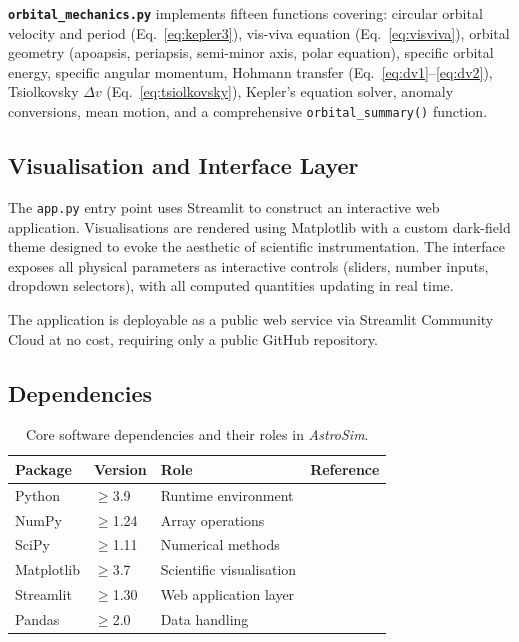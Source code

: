 \documentclass[10pt,a4paper]{article}
\begin{document}
\textbf{\texttt{orbital\_mechanics.py}} implements fifteen functions covering:
circular orbital velocity and period (Eq.~\ref{eq:kepler3}), vis-viva equation
(Eq.~\ref{eq:visviva}), orbital geometry (apoapsis, periapsis, semi-minor axis,
polar equation), specific orbital energy, specific angular momentum, Hohmann
transfer (Eq.~\ref{eq:dv1}--\ref{eq:dv2}), Tsiolkovsky $\Delta v$
(Eq.~\ref{eq:tsiolkovsky}), Kepler's equation solver, anomaly conversions, mean
motion, and a comprehensive \texttt{orbital\_summary()} function.

\subsection{Visualisation and Interface Layer}

The \texttt{app.py} entry point uses Streamlit \citep{streamlit2019} to
construct an interactive web application.
Visualisations are rendered using Matplotlib \citep{hunter2007} with a custom
dark-field theme designed to evoke the aesthetic of scientific instrumentation.
The interface exposes all physical parameters as interactive controls
(sliders, number inputs, dropdown selectors), with all computed quantities
updating in real time.

The application is deployable as a public web service via Streamlit Community
Cloud at no cost, requiring only a public GitHub repository.

\subsection{Dependencies}

\begin{table}[h!]
\centering
\caption{Core software dependencies and their roles in \textit{AstroSim}.}
\label{tab:deps}
\begin{tabular}{llll}
\toprule
Package & Version & Role & Reference \\
\midrule
Python    & $\geq$3.9  & Runtime environment      & \citet{vanrossum2009} \\
NumPy     & $\geq$1.24 & Array operations         & \citet{harris2020} \\
SciPy     & $\geq$1.11 & Numerical methods        & \citet{virtanen2020} \\
Matplotlib& $\geq$3.7  & Scientific visualisation & \citet{hunter2007} \\
Streamlit & $\geq$1.30 & Web application layer    & \citet{streamlit2019} \\
Pandas    & $\geq$2.0  & Data handling            & \citet{mckinney2010} \\
\bottomrule
\end{tabular}
\end{table}
\end{document}
